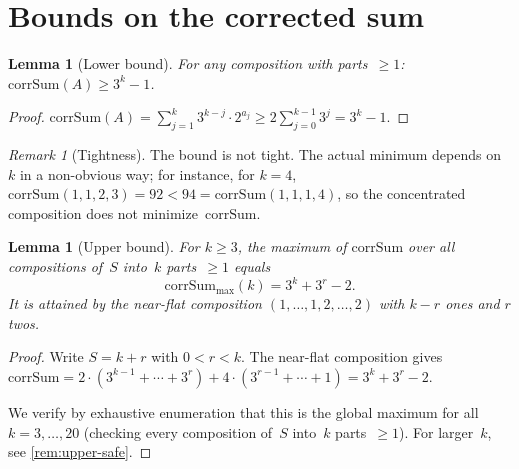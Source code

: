 \documentclass[11pt, a4paper]{amsart}
\theoremstyle{plain}
\newtheorem{lemma}[theorem]{Lemma}
\theoremstyle{definition}
\theoremstyle{remark}
\newtheorem{remark}[theorem]{Remark}
\newcommand{\corrSum}{\mathrm{corrSum}}
\begin{document}
\section{Bounds on the corrected sum}\label{sec:bounds}

\begin{lemma}[Lower bound]\label{lem:cs-min}
  For any composition with parts~$\geq 1$:
  $\corrSum(A) \geq 3^k - 1$.
\end{lemma}

\begin{proof}
  $\corrSum(A) = \sum_{j=1}^{k} 3^{k-j} \cdot 2^{a_j}
  \geq 2 \sum_{j=0}^{k-1} 3^{j} = 3^k - 1$.
\end{proof}

\begin{remark}[Tightness]\label{rem:lower-tight}
  The bound is not tight.  The actual minimum depends on~$k$
  in a non-obvious way; for instance, for $k = 4$,
  $\corrSum(1,1,2,3) = 92 < 94 = \corrSum(1,1,1,4)$,
  so the concentrated composition does not minimize~$\corrSum$.
\end{remark}

\begin{lemma}[Upper bound]\label{lem:cs-max}
  For $k \geq 3$, the maximum of $\corrSum$ over all
  compositions of~$S$ into~$k$ parts~$\geq 1$ equals
  \begin{equation}\label{eq:cs-max}
    \corrSum_{\max}(k) = 3^k + 3^r - 2.
  \end{equation}
  It is attained by the near-flat composition
  $(1, \ldots, 1, 2, \ldots, 2)$ with $k - r$ ones and $r$ twos.
\end{lemma}

\begin{proof}
  Write $S = k + r$ with $0 < r < k$.  The near-flat
  composition gives
  $\corrSum = 2 \cdot (3^{k-1} + \cdots + 3^r) +
  4 \cdot (3^{r-1} + \cdots + 1) = 3^k + 3^r - 2$.

  We verify by exhaustive enumeration that this is the
  global maximum for all $k = 3, \ldots, 20$
  (checking every composition of~$S$ into~$k$ parts~$\geq 1$).
  For larger~$k$, see \cref{rem:upper-safe}.
\end{proof}
\end{document}
